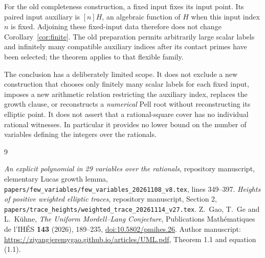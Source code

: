 \documentclass[11pt,a4paper]{article}
\begin{document}
For the old completeness construction, a fixed input fixes its input
point. Its paired input auxiliary is $[n]H$, an algebraic function
of $H$ when this input index $n$ is fixed. Adjoining these fixed-input
data therefore does not change Corollary~\ref{cor:finite}.
The old preparation permits arbitrarily large scalar labels and
infinitely many compatible auxiliary indices after its contact primes
have been selected; the theorem applies to that flexible family.

The conclusion has a deliberately limited scope. It does not exclude
a new construction that chooses only finitely many scalar labels for
each fixed input, imposes a new arithmetic relation restricting the
auxiliary index, replaces the growth clause, or reconstructs a
\emph{numerical} Pell root without reconstructing its elliptic point.
It does not assert that a rational-square cover has no individual
rational witnesses. In particular it provides no lower bound on the
number of variables defining the integers over the rationals.

\begin{thebibliography}{9}\raggedright
{}\emph{An explicit polynomial in 29 variables over the
rationals}, repository manuscript, elementary Lucas growth lemma,
\nolinkurl{papers/few_variables/few_variables_20261108_v8.tex},
lines 349--397.
\emph{Heights of positive weighted elliptic traces}, repository
manuscript, Section 2,
\nolinkurl{papers/trace_heights/weighted_trace_20261114_v27.tex}.
Z.~Gao, T.~Ge and L.~K\"uhne,
\emph{The Uniform Mordell--Lang Conjecture},
Publications Math\'ematiques de l'IH\'ES \textbf{143} (2026), 189--235,
\href{https://doi.org/10.5802/pmihes.26}{doi:10.5802/pmihes.26}.
Author manuscript:
\url{https://ziyangjeremygao.github.io/articles/UML.pdf},
Theorem 1.1 and equation (1.1).
\end{thebibliography}
\end{document}
